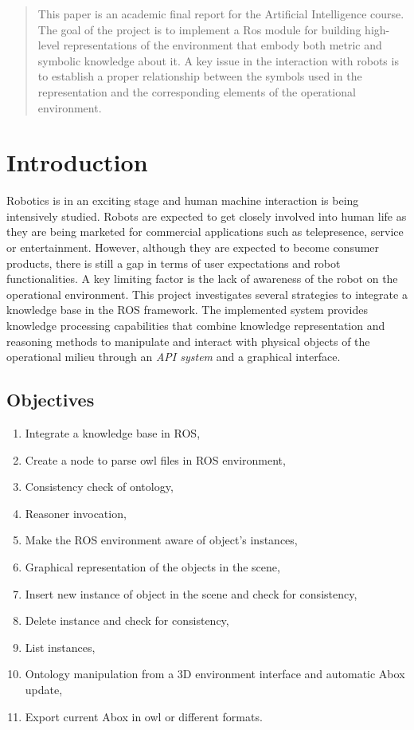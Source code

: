 \begin{abstract}
This paper is an academic final report for the Artificial Intelligence course. The goal of the project is to implement a Ros module for building high-level representations of the environment that embody both metric and symbolic knowledge about it. A key issue in the interaction with robots is to establish a proper relationship between the symbols used in the representation and the corresponding elements of the operational environment.
\end{abstract}	

\section{Introduction}

Robotics is in an exciting stage and human machine interaction is being intensively studied.
Robots are expected to get closely involved into human life as they are being marketed for commercial applications such as telepresence, service or entertainment. However, although they are expected to become consumer products, there is still a gap in terms of user expectations and robot functionalities. A key limiting factor is the lack of awareness of the robot on the operational environment.
This project investigates several strategies to integrate a knowledge base in the ROS framework. The implemented system provides knowledge processing capabilities that combine knowledge representation and reasoning methods to manipulate and interact with physical objects of the operational milieu through an \textit{API system} and a graphical interface.\\

\subsection{Objectives}
\label{sec:objectives}

\begin{enumerate}
\item Integrate a knowledge base in ROS,
\item Create a node to parse owl files in ROS environment,
\item Consistency check of ontology,
\item Reasoner invocation,
\item Make the ROS environment aware of object's instances,
\item Graphical representation of the objects in the scene,
\item Insert new instance of object in the scene and check for consistency,
\item Delete instance and check for consistency,
\item List instances,
\item Ontology manipulation from a 3D environment interface and automatic Abox update,
\item Export current Abox in owl or different formats.
\end{enumerate}

